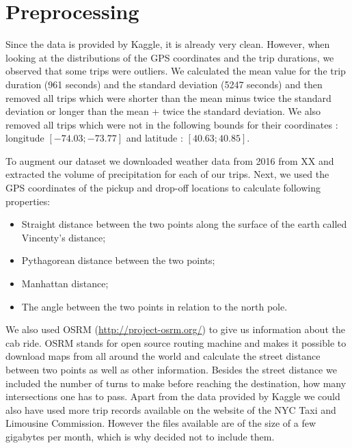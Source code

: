 \documentclass[a4paper]{article}
\begin{document}
\section{Preprocessing}
Since the data is provided by Kaggle, it is already very clean. However, when
looking at the distributions of the GPS coordinates and the trip durations, we
observed that some trips were outliers. We calculated the mean value for the
trip duration (961 seconds) and the standard deviation (5247 seconds) and then
removed all trips which were shorter than the mean minus twice the standard
deviation or longer than the mean + twice the standard deviation. We also
removed all trips which were not in the following bounds for their coordinates :
longitude $[-74.03;-73.77]$ and latitude : $[40.63;40.85]$.

To augment our  dataset  we downloaded weather data from 2016 from XX and
extracted the volume of precipitation for each of our trips. Next, we used the
GPS coordinates of the pickup and drop-off locations to calculate following
properties:
\begin{itemize}
    \item Straight distance between the two points along the surface of the
earth called Vincenty’s distance;
    \item Pythagorean distance between the two points;
    \item Manhattan distance;
    \item The angle between the two points in relation to the north pole.
\end{itemize}
We also used OSRM (\url{http://project-osrm.org/}) to give us information
about the cab ride. OSRM stands for open source routing machine and makes it
possible to download maps from all around the world and calculate the street
distance between two points as well as other information. Besides the street
distance we included the number of turns to make before reaching the
destination, how many intersections one has to pass.  Apart from the data
provided by Kaggle we could also have used more trip records available on the
website of the NYC Taxi and Limousine Commission. However the files available
are of the size of a few gigabytes per month, which is why decided not to
include them.
\end{document}
